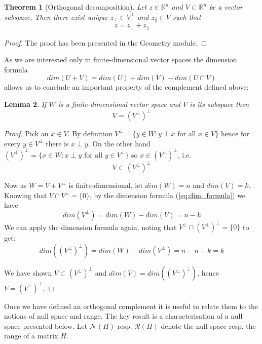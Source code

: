 \documentclass[a4paper,11pt]{article}
\theoremstyle{break}
\newtheorem{theorem}{Theorem}[section]
\newtheorem{lemma}[theorem]{Lemma}
\newcommand{\R}{\mathbb{R}}
\newcommand{\Nu}{\mathcal{N}}
\newcommand{\Ra}{\mathcal{R}}
\newcommand{\pll}{\parallel}
\begin{document}
\begin{theorem}[Orthogonal decomposition] \label{thm:projection}
    Let $z \in \R^n$ and $V \subset \R^n$ be a vector subspace. Then
    there exist unique $z_\perp \in V^\perp$ and $z_\pll \in V$ such that  
    \begin{equation}
        z = z_\perp + z_\pll
    \end{equation}
\end{theorem}

\begin{proof}
    The proof has been presented in the Geometry module.
\end{proof}

As we are interested only in finite-dimensional vector spaces the dimension formula
\begin{equation}\label{eq:dim_formula}
    dim(U + V) = dim(U) + dim(V) - dim( U \cap V)
\end{equation}
allows us to conclude an important property of the complement defined above:

\begin{lemma}\label{lem:double_perp}
    If $W$ is a finite-dimensional vector space and $V$ is its subspace then
    $$ V = (V^\perp)^\perp $$
\end{lemma}

\begin{proof}
    Pick an $x \in V$.
    By definition $ V^\perp = \{ y \in W : y \perp x \text{ for all } x \in V \}$ 
    hence for every $y \in V^\perp $ there is $x \perp y$.
    On the other hand 
    $ (V^\perp)^\perp = \{ x \in W : x \perp y \text{ for all } y \in V^\perp \}$ so 
    $x \in (V^\perp)^\perp$, i.e.
    $$ V \subset (V^\perp)^\perp$$

    Now as $W = V + V^\perp$ is finite-dimensional, let $dim(W) = n$ and $dim(V) = k$. 
    Knowing that $V \cap V^\perp = \{0\}$, by the dimension formula (\ref{eq:dim_formula}) we have
    $$ dim(V^\perp) = dim(W) - dim(V) = n - k $$
    We can apply the dimension formula again, noting that $ V^\perp \cap (V^\perp)^\perp = \{0\} $ to get:
    $$ dim((V^\perp)^\perp) = dim(W) - dim(V^\perp) = n - n + k = k $$

    We have shown $ V \subset (V^\perp)^\perp$ and $ dim(V) = dim((V^\perp)^\perp)$,
    hence $ V = (V^\perp)^\perp$.
\end{proof}

Once we have defined an orthogonal complement it is useful to relate them to the notions of null space and range.
The key result is a characterisation of a null space presented below.
Let $\Nu(H)$ resp. $\Ra(H)$ denote the null space resp. the range of a matrix $H$.
\end{document}
